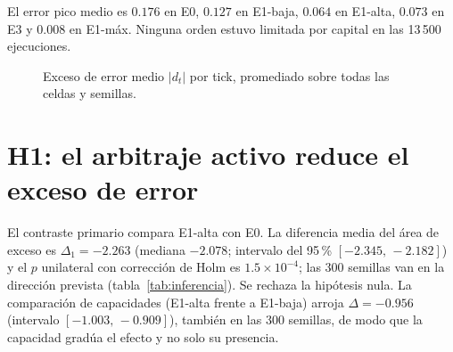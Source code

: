 El error pico medio es $0.176$ en E0, $0.127$ en E1-baja, $0.064$ en E1-alta, $0.073$ en E3 y $0.008$ en E1-máx. Ninguna orden estuvo limitada por capital en las 13\,500 ejecuciones.

\begin{figure}[htbp]
\centering
{}
\caption{Exceso de error medio $|d_t|$ por tick, promediado sobre todas las celdas y semillas.}
\label{fig:trayectorias}
\end{figure}

\section{H1: el arbitraje activo reduce el exceso de error}
\label{sec:res-h1}

El contraste primario compara E1-alta con E0. La diferencia media del área de exceso es $\Delta_1=-2.263$ (mediana $-2.078$; intervalo del 95\,\% $[-2.345,\,-2.182]$) y el $p$ unilateral con corrección de Holm es $1.5\times10^{-4}$; las 300 semillas van en la dirección prevista (tabla~\ref{tab:inferencia}). Se rechaza la hipótesis nula. La comparación de capacidades (E1-alta frente a E1-baja) arroja $\Delta=-0.956$ (intervalo $[-1.003,\,-0.909]$), también en las 300 semillas, de modo que la capacidad gradúa el efecto y no solo su presencia.

